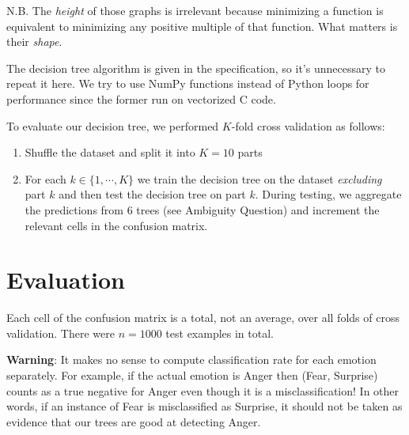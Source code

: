 \documentclass[12pt, a4paper]{article}
\begin{document}
N.B. The \textit{height} of those graphs is irrelevant because minimizing a function is equivalent to minimizing any positive multiple of that function. What matters is their \textit{shape}.\par
\bigskip
The decision tree algorithm is given in the specification, so it's unnecessary to repeat it here. We try to use NumPy functions instead of Python loops for performance since the former run on vectorized C code.\par
\bigskip
To evaluate our decision tree, we performed $K$-fold cross validation as follows:
\begin{enumerate}
    \item Shuffle the dataset and split it into $K = 10$ parts
    \item For each $k \in \{1, \dotsm, K\}$ we train the decision tree on the dataset \textit{excluding} part $k$ and then test the decision tree on part $k$. During testing, we aggregate the predictions from 6 trees (see Ambiguity Question) and increment the relevant cells in the confusion matrix.
\end{enumerate}

\section*{Evaluation}
Each cell of the confusion matrix is a total, not an average, over all folds of cross validation. There were $n = 1000$ test examples in total.\par
\bigskip
\textbf{Warning}: It makes no sense to compute classification rate for each emotion separately. For example, if the actual emotion is Anger then (Fear, Surprise) counts as a true negative for Anger even though it is a misclassification! In other words, if an instance of Fear is misclassified as Surprise, it should not be taken as evidence that our trees are good at detecting Anger.\par
\bigskip
\end{document}
